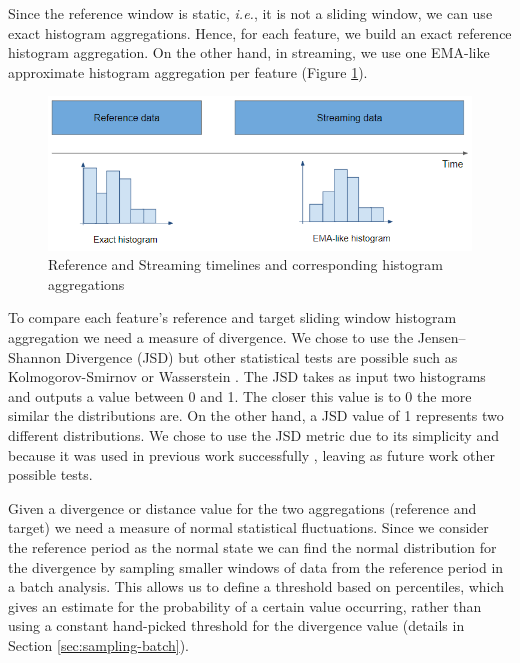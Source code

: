 Since the reference window is static, \textit{i.e.}, it is not a sliding window, we can use exact histogram aggregations. Hence, for each feature, we build an exact reference histogram aggregation. On the other hand, in streaming, we use one EMA-like approximate histogram aggregation per feature (Figure \ref{fig:timelines-hists}).


\begin{figure}[!htb]
    \begin{center}
      \includegraphics[scale=0.7]{figures/timelines-hists.png}
      \caption[]{Reference and Streaming timelines and corresponding histogram aggregations}
      \label{fig:timelines-hists}
    \end{center}
\end{figure}


To compare each feature's reference and target sliding window histogram aggregation we need a measure of divergence. We chose to use the Jensen–Shannon Divergence (JSD) \cite{JSD} but other statistical tests are possible such as Kolmogorov-Smirnov or Wasserstein \cite{EncyclopaediaMathematics}. The JSD takes as input two histograms and outputs a value between 0 and 1. The closer this value is to 0 the more similar the distributions are. On the other hand, a JSD value of 1 represents two different distributions. We chose to use the JSD metric due to its simplicity and because it was used in previous work successfully \cite{SAMM}, leaving as future work other possible tests. 

Given a divergence or distance value for the two aggregations (reference and target) we need a measure of normal statistical fluctuations. Since we consider the reference period as the normal state we can find the normal distribution for the divergence by sampling smaller windows of data from the reference period in a batch analysis. This allows us to define a threshold based on percentiles, which gives an estimate for the probability of a certain value occurring, rather than using a constant hand-picked threshold for the divergence value (details in Section \ref{sec:sampling-batch}). 


